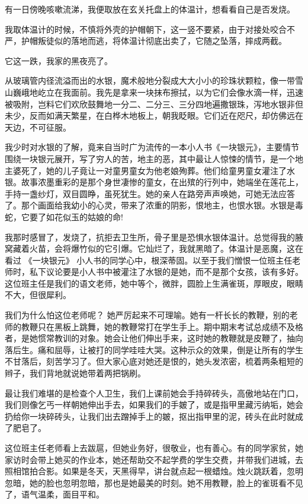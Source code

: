 \documentclass{ctexart}
\renewcommand{\\}{\par}
\begin{document}
\\有一日傍晚咳嗽流涕，我便取放在玄关托盘上的体温计，想看看自己是否发烧。
\\我取体温计的时候，不慎将外壳的护帽朝下，这一竖不要紧，由于对接处咬合不严，护帽叛徒似的落地而逃，将体温计彻底出卖了，它随之坠落，摔成两截。
\\它这一跌，我家的黑夜亮了。
\\从玻璃管内径流溢而出的水银，魔术般地分裂成大大小小的珍珠状颗粒，像一带雪山巍峨地屹立在我面前。我先是拿来一块抹布擦拭，以为它们会像水滴一样，迅速被吸附，岂料它们欢欣鼓舞地一分二、二分三、三分四地遍撒银珠，泻地水银非但未少，反而如满天繁星，在白桦木地板上，朝我眨眼。它们近在咫尺，却仿佛远在天边，不可征服。
\\我少时对水银的了解，竟来自当时广为流传的一本小人书《一块银元》，主要情节围绕一块银元展开，写了穷人的苦，地主的恶，其中最让人惊悚的情节，是一个地主婆死了，她的儿子竟让一对童男童女为他老娘殉葬。他们给童男童女灌注了水银。故事浓墨重彩的是那个身世凄惨的童女，在出殡的行列中，她端坐在莲花上，手持一盏纱灯，双目圆睁，虽死犹生。她的亲人在路旁声声唤她，可她无法应答了。那个画面给我幼小的心灵，带来了浓重的阴影，恨地主，也恨水银。水银是毒蛇，它要了如花似玉的姑娘的命!
\\我那时感冒了，发烧了，抗拒去卫生所，骨子里是恐惧水银体温计。总觉得我的腋窝藏着火苗，会将爆竹似的它引爆。它灿烂了，我就黑暗了。体温计是恶魔，这在看过 《一块银元》 小人书的同学心中，根深蒂固。以至于我们憎恨一位班主任老师时，私下议论要是小人书中被灌注了水银的是她，而不是那个女孩，该有多好。这位班主任是我们的语文老师，她中等个，微胖，圆脸上生满雀斑，厚眼皮，眼睛不大，但很犀利。
\\我们为什么怕这位老师呢？ 她严厉起来不可理喻。她有一杆长长的教鞭，别的老师的教鞭只在黑板上跳舞，她的教鞭常打在学生手上。期中期末考试总成绩不及格者，是她惯常教训的对象。她会让他们伸出手来，这时她的教鞭就是皮鞭了，抽向落后生。痛和屈辱，让被打的同学哇哇大哭。这种示众的效果，倒是让所有的学生不甘落后，刻苦学习了。但大家心底对她还是恨的，她头发浓密，梳着两条粗短的辫子，我们背地就说她带着两把锅刷。
\\最让我们难堪的是检查个人卫生，我们上课前她会手持碎砖头，高傲地站在门口，我们则像乞丐一样朝她伸出手去，如果我们的手皴了，或是指甲里藏污纳垢，她会扔给你一块碎砖头，让我们出去蹭掉手上的皴，抠出指甲里的泥，砖头在此时就成了肥皂了。
\\这位班主任老师看上去跋扈，但她业务好，很敬业，也有善心。有的同学家贫，她家访时会带上她买的作业本，她还帮助交不起学费的学生交费，并带我们进城，去照相馆拍合影。如果是冬天，天黑得早，讲台就点起一根蜡烛。烛火跳跃着，忽明忽暗，她的脸也忽明忽暗，那也是她最美的时刻。她不用教鞭，脸上的雀斑看不见了，语气温柔，面目平和。
\end{document}
